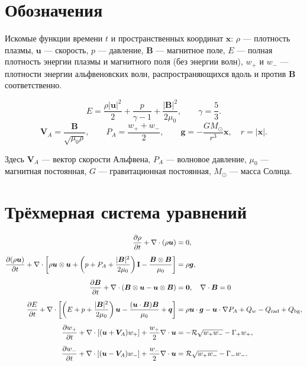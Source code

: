 \documentclass[12pt,a4paper]{article}
\newcommand{\vb}[1]{\bm{#1}}
\newcommand{\B}{\vb{B}}
\newcommand{\uvec}{\vb{u}}
\newcommand{\VA}{\vb{V}_A}
\newcommand{\PA}{P_A}
\newcommand{\Rref}{\mathcal R}
\newcommand{\Id}{\mathbf I}
\begin{document}
\section{Обозначения}

Искомые функции времени $t$ и пространственных координат
$\vb{x}$: $\rho$ --- плотность плазмы,
$\uvec$ --- скорость, $p$ --- давление,
$\B$ --- магнитное поле,
$E$ --- полная плотность энергии плазмы и магнитного поля
(без энергии волн), $w_+$ и $w_-$ --- плотности энергии
альфвеновских волн, распространяющихся вдоль
и против $\B$ соответственно.

\[
E=\frac{\rho|\uvec|^2}{2}
+\frac{p}{\gamma-1}
+\frac{|\B|^2}{2\mu_0},
\qquad \gamma=\frac53.
\]
\[
\VA=\frac{\B}{\sqrt{\mu_0\rho}},
\qquad
\PA=\frac{w_++w_-}{2},
\qquad
\vb{g}=-\frac{GM_\odot}{r^3}\vb{x},
\quad r=|\vb{x}|.
\]

Здесь $\VA$ --- вектор скорости Альфвена,
$\PA$ --- волновое давление,
$\mu_0$ --- магнитная постоянная,
$G$ --- гравитационная постоянная,
$M_\odot$ --- масса Солнца.

\section{Трёхмерная система уравнений}

\begingroup
\small
\begin{align}
\frac{\partial\rho}{\partial t}+\nabla\cdot(\rho\uvec)
&=0,
\label{eq:mass}\\[5pt]
\frac{\partial(\rho\uvec)}{\partial t}+\nabla\cdot\left[\rho\uvec\otimes\uvec+\left(p+\PA+\frac{|\B|^2}{2\mu_0}\right)\Id-\frac{\B\otimes\B}{\mu_0}\right]
&=\rho\vb{g},
\label{eq:momentum}\\[5pt]
\frac{\partial\B}{\partial t}+\nabla\cdot(\B\otimes\uvec-\uvec\otimes\B)
&=\vb{0}, \quad \nabla\cdot\B=0
\label{eq:induction}\\[5pt]
\frac{\partial E}{\partial t}+\nabla\cdot\left[\left(E+p+\frac{|\B|^2}{2\mu_0}\right)\uvec-\frac{(\uvec\cdot\B)\B}{\mu_0}+\vb{q}\right]
&=\rho\uvec\cdot\vb{g}-\uvec\cdot\nabla\PA+Q_w-Q_{\rm rad}+Q_{\rm bg},
\label{eq:energy}\\[5pt]
\frac{\partial w_+}{\partial t}+\nabla\cdot\left[(\uvec+\VA)w_+\right]+\frac{w_+}{2}\nabla\cdot\uvec
&=-\Rref\sqrt{w_+w_-}-\Gamma_+w_+,
\label{eq:wplus}\\[5pt]
\frac{\partial w_-}{\partial t}+\nabla\cdot\left[(\uvec-\VA)w_-\right]+\frac{w_-}{2}\nabla\cdot\uvec
&=\Rref\sqrt{w_+w_-}-\Gamma_-w_-.
\label{eq:wminus}
\end{align}
\endgroup
\end{document}
